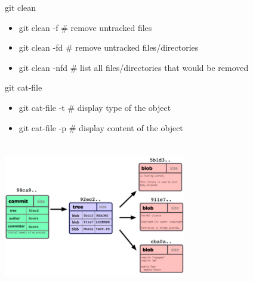 \documentclass[11pt,xcolor={dvipsnames}]{beamer} %
\begin{document}
\begin{frame}
	\begin{block}{git clean}
		\begin{itemize}
			\item git clean -f     \# remove untracked files
			\item git clean -fd    \# remove untracked files/directories
			\item git clean -nfd   \# list all files/directories that would be removed
		\end{itemize}
	\end{block}
\end{frame}

\begin{frame}
	\begin{block}{git cat-file}
		\begin{itemize}
			\item git cat-file -t    \# display type of the object
			\item git cat-file -p    \# display content of the object
		\end{itemize}
	\end{block}
\end{frame}

\begin{frame}
	\includegraphics[height=250px,width=300px]{git-blobs.jpg}
\end{frame}
\end{document}
